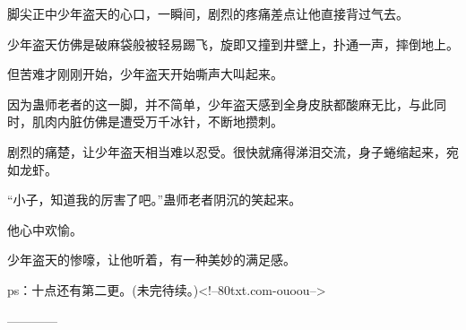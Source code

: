 \begin{this_body}
脚尖正中少年盗天的心口，一瞬间，剧烈的疼痛差点让他直接背过气去。

少年盗天仿佛是破麻袋般被轻易踢飞，旋即又撞到井壁上，扑通一声，摔倒地上。

但苦难才刚刚开始，少年盗天开始嘶声大叫起来。

因为蛊师老者的这一脚，并不简单，少年盗天感到全身皮肤都酸麻无比，与此同时，肌肉内脏仿佛是遭受万千冰针，不断地攒刺。

剧烈的痛楚，让少年盗天相当难以忍受。很快就痛得涕泪交流，身子蜷缩起来，宛如龙虾。

“小子，知道我的厉害了吧。”蛊师老者阴沉的笑起来。

他心中欢愉。

少年盗天的惨嚎，让他听着，有一种美妙的满足感。

ps：十点还有第二更。(未完待续。)<!--80txt.com-ouoou-->

------------

\end{this_body}

